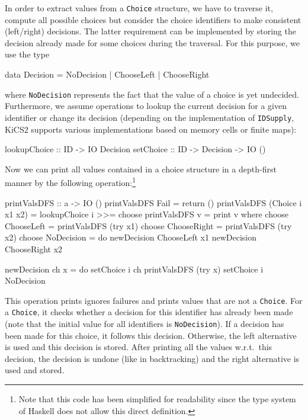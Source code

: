 \documentclass{llncs}
\newcommand{\code}[1]{\mbox{\small\texttt{#1}}}
\begin{document}
In order to extract values from a \code{Choice} structure,
we have to traverse it, compute all possible choices
but consider the choice identifiers to make consistent (left/right)
decisions.
The latter requirement can be implemented by storing
the decision already made for some choices during the traversal.
For this purpose, we use the type
\begin{haskell}
  data Decision = NoDecision | ChooseLeft | ChooseRight
\end{haskell}
where \code{NoDecision} represents the fact that the value of a choice
is yet undecided.
Furthermore, we assume operations to lookup the current decision
for a given identifier or change its decision (depending on the implementation
of \code{IDSupply}, KiCS2 supports various implementations
based on memory cells or finite maps):
\begin{haskell}
  lookupChoice :: ID -> IO Decision
  setChoice    :: ID -> Decision -> IO ()
\end{haskell}
%
Now we can print all values contained in a choice structure
in a depth-first manner by the following operation:\footnote{%
Note that this code has been simplified for readability
since the type system of Haskell does not
allow this direct definition.}
\label{sec:printValsDFS}
\begin{haskell}
  printValsDFS :: a -> IO ()
  printValsDFS Fail             = return ()
  printValsDFS (Choice i x1 x2) = lookupChoice i >>= choose
  printValsDFS v                = print v
   where
    choose ChooseLeft  = printValsDFS (try x1)
    choose ChooseRight = printValsDFS (try x2)
    choose NoDecision  = do newDecision ChooseLeft  x1
                            newDecision ChooseRight x2

    newDecision ch x = do setChoice i ch
                          printValsDFS (try x)
                          setChoice i NoDecision
\end{haskell}
This operation prints ignores failures and prints values
that are not a \code{Choice}. For a \code{Choice},
it checks whether a decision for
this identifier has already been made (note that the initial value
for all identifiers is \code{NoDecision}).
If a decision has been made for this choice, it follows this decision.
Otherwise, the left alternative is used and this decision is stored.
After printing
all the values w.r.t.\ this decision,
the decision is undone (like in backtracking)
and the right alternative is used and stored.
\end{document}
